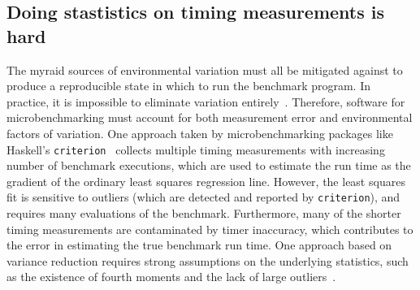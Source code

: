 \documentclass[conference]{IEEEtran}
\begin{document}

\label{sec:stats}
\subsection{Doing stastistics on timing measurements is hard}

The myraid sources of environmental variation must all be mitigated against to
produce a reproducible state in which to run the benchmark program. In practice,
it is impossible to eliminate variation entirely~\cite{Alcocer2015,Barrett2016}.
Therefore, software for microbenchmarking must account for both measurement error
and environmental factors of variation.
One approach taken by microbenchmarking packages like Haskell's
\lstinline|criterion|~\cite{criterion} collects multiple timing measurements
with increasing number of benchmark executions, which are used to estimate the
run time as the gradient of the ordinary least squares regression line.
However, the least squares fit is sensitive to outliers (which are detected and
reported by \lstinline|criterion|), and requires many evaluations of the benchmark.
Furthermore, many of the shorter timing measurements are contaminated by timer
inaccuracy, which contributes to the error in estimating the true benchmark run time.
One approach based on variance reduction requires strong assumptions on the
underlying statistics, such as the existence of fourth moments and the lack of
large outliers~\cite{Kalibera2006,Kalibera2013}.
\end{document}
